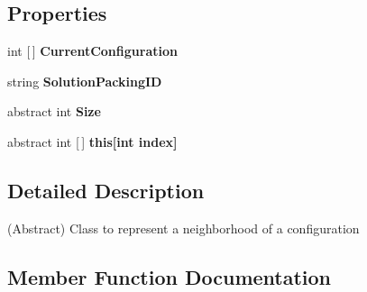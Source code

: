 \subsection*{Properties}
\begin{DoxyCompactItemize}
\item 
\mbox{\label{classPOSL_1_1Data_1_1Neighborhood_a3f456c4d9b95e61ad17e3c68f5a1930e}} 
int \mbox{[}$\,$\mbox{]} {\bfseries Current\+Configuration}
\item 
\mbox{\label{classPOSL_1_1Data_1_1Neighborhood_a7363f3e9bb33274139142cb36292b816}} 
string {\bfseries Solution\+Packing\+ID}
\item 
\mbox{\label{classPOSL_1_1Data_1_1Neighborhood_a1b9d521ea7bf517c33a513215ef65582}} 
abstract int {\bfseries Size}
\item 
\mbox{\label{classPOSL_1_1Data_1_1Neighborhood_a492cc83da8bb5955f5dc42a14d4423ec}} 
abstract int \mbox{[}$\,$\mbox{]} {\bfseries this\mbox{[}int index\mbox{]}}
\end{DoxyCompactItemize}


\subsection{Detailed Description}
(Abstract) Class to represent a neighborhood of a configuration 

\subsection{Member Function Documentation}
\mbox{\label{classPOSL_1_1Data_1_1Neighborhood_aa7014a3cbaf532f49d89468c20b7c269}} 

